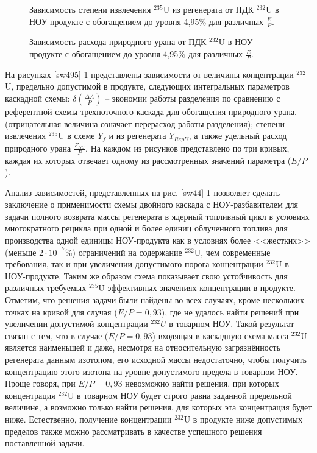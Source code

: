 \begin{figure}
    \centering
    \begin{minipage}{.5\textwidth}
      \centering
      
\caption{{Зависимость степени извлечения $^{235}$U из регенерата от ПДК $^{232}$U в НОУ-продукте с обогащением до уровня 4,95\% для различных $\frac{E}{P}$.{\label{exR495}}}}
    \end{minipage}%
    \begin{minipage}{.5\textwidth}
      \centering
      
\caption{{Зависимость расхода природного урана от ПДК $^{232}$U в НОУ-продукте с обогащением до уровня 4,95\% для различных $\frac{E}{P}$.{\label{F0R495}}}}
\end{minipage}
\end{figure}


    
На рисунках \ref{sw495}-\ref{F0R495} представлены зависимости от величины концентрации $^{232}$U, предельно допустимой в продукте, следующих интегральных параметров каскадной схемы: $\delta(\frac{\Delta A}{P})$ -- экономии работы разделения по сравнению с референтной схемы трехпоточного каскада для обогащения природного урана.(отрицательная величина означает перерасход работы разделения); степени извлечения $^{235}$U в схеме $Y_f$ и из регенерата $Y_{RepU}$, а также удельный расход природного урана $\frac{F_{NU}}{P}$. На каждом из рисунков представлено по три кривых, каждая их которых отвечает одному из рассмотренных значений параметра ($E/P$).

Анализ зависимостей, представленных на рис. \ref{sw44}-\ref{F0R495} позволяет сделать заключение о применимости схемы двойного каскада с НОУ-разбавителем для задачи полного возврата массы регенерата в ядерный топливный цикл в условиях многократного рецикла при одной и более единиц облученного топлива для производства одной единицы НОУ-продукта как в условиях более <<жестких>> (меньше $2\cdot10^{-7}$\%) ограничений на содержание $^{232}$U, чем современные требования, так и при увеличении допустимого порога концентрации $^{232}$U в НОУ-продукте. 
Таким же образом схема показывает свою устойчивость для различных требуемых $^{235}$U эффективных значениях концентрации в продукте. Отметим, что решения задачи были найдены во всех случаях, кроме нескольких точках на кривой для случая ($E/P=0,93$), где не удалось найти решений при увеличении допустимой концентрации $^{232}U$ в товарном НОУ. Такой результат связан с тем, что в случае ($E/P=0,93$) входящая в каскадную схема масса $^{232}$U является наименьшей и даже, несмотря на относительную загрязнённость регенерата данным изотопом, его исходной массы недостаточно, чтобы получить концентрацию этого изотопа на  уровне допустимого предела в товарном НОУ. Проще говоря, при $E/P=0,93$ невозможно найти решения, при которых концентрация $^{232}$U в товарном НОУ будет строго равна заданной предельной величине, а возможно только найти решения, для которых эта концентрация будет ниже. Естественно, получение концентрации $^{232}$U в продукте ниже допустимых пределов также можно рассматривать в качестве успешного решения поставленной задачи.  

